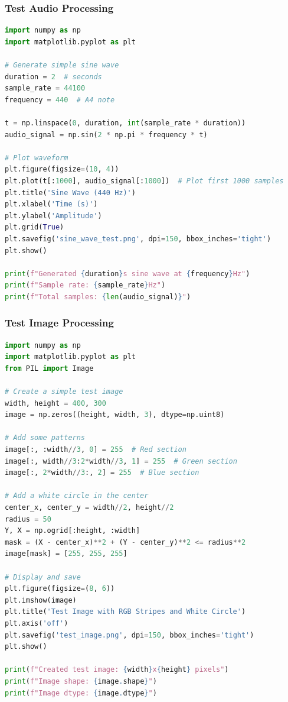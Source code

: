 \documentclass[11pt,a4paper]{article}
\begin{document}
\subsubsection{Test Audio Processing}
\begin{lstlisting}[language=Python, caption=Test audio processing sederhana]
import numpy as np
import matplotlib.pyplot as plt

# Generate simple sine wave
duration = 2  # seconds
sample_rate = 44100
frequency = 440  # A4 note

t = np.linspace(0, duration, int(sample_rate * duration))
audio_signal = np.sin(2 * np.pi * frequency * t)

# Plot waveform
plt.figure(figsize=(10, 4))
plt.plot(t[:1000], audio_signal[:1000])  # Plot first 1000 samples
plt.title('Sine Wave (440 Hz)')
plt.xlabel('Time (s)')
plt.ylabel('Amplitude')
plt.grid(True)
plt.savefig('sine_wave_test.png', dpi=150, bbox_inches='tight')
plt.show()

print(f"Generated {duration}s sine wave at {frequency}Hz")
print(f"Sample rate: {sample_rate}Hz")
print(f"Total samples: {len(audio_signal)}")
\end{lstlisting}

\subsubsection{Test Image Processing}
\begin{lstlisting}[language=Python, caption=Test image processing sederhana]
import numpy as np
import matplotlib.pyplot as plt
from PIL import Image

# Create a simple test image
width, height = 400, 300
image = np.zeros((height, width, 3), dtype=np.uint8)

# Add some patterns
image[:, :width//3, 0] = 255  # Red section
image[:, width//3:2*width//3, 1] = 255  # Green section
image[:, 2*width//3:, 2] = 255  # Blue section

# Add a white circle in the center
center_x, center_y = width//2, height//2
radius = 50
Y, X = np.ogrid[:height, :width]
mask = (X - center_x)**2 + (Y - center_y)**2 <= radius**2
image[mask] = [255, 255, 255]

# Display and save
plt.figure(figsize=(8, 6))
plt.imshow(image)
plt.title('Test Image with RGB Stripes and White Circle')
plt.axis('off')
plt.savefig('test_image.png', dpi=150, bbox_inches='tight')
plt.show()

print(f"Created test image: {width}x{height} pixels")
print(f"Image shape: {image.shape}")
print(f"Image dtype: {image.dtype}")
\end{lstlisting}
\end{document}
